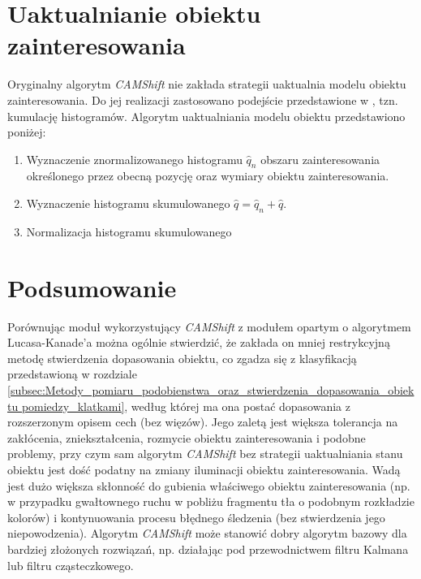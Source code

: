 \section{Uaktualnianie obiektu zainteresowania}
\label{sec:Modul_CAMShift_Uaktualnianie_obiektu_zaintersowania}

Oryginalny algorytm \textit{CAMShift} nie zakłada strategii uaktualnia modelu obiektu zainteresowania. Do jej realizacji zastosowano podejście przedstawione w \cite{Exner2010}, tzn. kumulację histogramów. Algorytm uaktualniania modelu obiektu przedstawiono poniżej:

\begin{enumerate}

	\item Wyznaczenie znormalizowanego histogramu $\hat{q}_n$ obszaru zainteresowania określonego przez obecną pozycję oraz wymiary obiektu zainteresowania.
	\item Wyznaczenie histogramu skumulowanego $\hat{q} =  \hat{q}_n + \hat{q}$.
	\item Normalizacja histogramu skumulowanego

\end{enumerate}

\section{Podsumowanie}
\label{sec:Modul_CAMShift_podsumowanie}

Porównując moduł wykorzystujący \textit{CAMShift} z modułem opartym o algorytmem Lucasa-Kanade'a można ogólnie stwierdzić, że zakłada on mniej restrykcyjną metodę stwierdzenia dopasowania obiektu, co zgadza się z klasyfikacją przedstawioną w rozdziale \ref{subsec:Metody_pomiaru_podobienstwa_oraz_stwierdzenia_dopasowania_obiektu pomiedzy_klatkami}, według której ma ona postać dopasowania z rozszerzonym opisem cech (bez więzów). Jego zaletą jest większa tolerancja na zakłócenia, zniekształcenia, rozmycie obiektu zainteresowania i podobne problemy, przy czym sam algorytm \textit{CAMShift} bez strategii uaktualniania stanu obiektu jest dość podatny na zmiany iluminacji obiektu zainteresowania. Wadą jest dużo większa skłonność do gubienia właściwego obiektu zainteresowania (np. w przypadku gwałtownego ruchu w pobliżu fragmentu tła o podobnym rozkładzie kolorów) i kontynuowania procesu błędnego śledzenia (bez stwierdzenia jego niepowodzenia). Algorytm \textit{CAMShift} może stanowić dobry algorytm bazowy dla bardziej złożonych rozwiązań, np. działając pod przewodnictwem filtru Kalmana lub filtru cząsteczkowego.